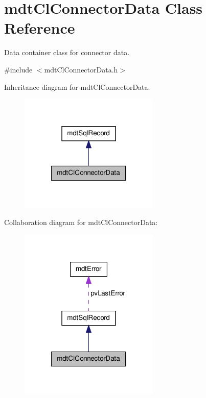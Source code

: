 \hypertarget{classmdt_cl_connector_data}{\section{mdt\-Cl\-Connector\-Data Class Reference}
\label{classmdt_cl_connector_data}
}


Data container class for connector data.  




{\ttfamily \#include $<$mdt\-Cl\-Connector\-Data.\-h$>$}



Inheritance diagram for mdt\-Cl\-Connector\-Data\-:
\nopagebreak
\begin{figure}[H]
\begin{center}
\leavevmode
\includegraphics[width=188pt]{classmdt_cl_connector_data__inherit__graph}
\end{center}
\end{figure}


Collaboration diagram for mdt\-Cl\-Connector\-Data\-:
\nopagebreak
\begin{figure}[H]
\begin{center}
\leavevmode
\includegraphics[width=188pt]{classmdt_cl_connector_data__coll__graph}
\end{center}
\end{figure}
